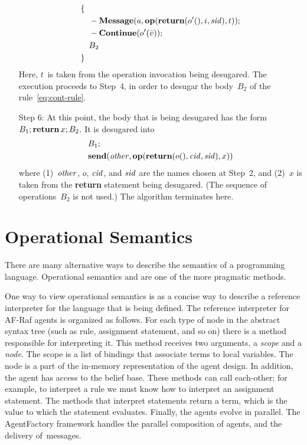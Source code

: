 \documentclass[a4paper,12pt,oneside,fleqn]{book} %
\begin{document}
\begin{itemize}
\begin{align}
\begin{aligned}
&\{ \\
&\quad -{\bf Message}(a,{\bf op}({\bf return}(o'(),i,{\it sid}), t)); \\
&\quad -{\bf Continue}(o'(\bar v)); \\
&\quad B_2 \\
&\}
\end{aligned}
\label{eq:cont-rule}
\end{align}
  Here, $t$~is taken from the operation invocation being desugared.  The
  execution proceeds to Step~4, in order to desugar the body~$B_2$ of the
  rule~\eqref{eq:cont-rule}.
\item[Step 6:]
  At this point, the body that is being desugared has the form $B_1;{\bf
  return}\,x;B_2$. It is desugared into
\begin{align}
\begin{aligned}
&B_1; \\
&{\bf send}({\it other}, {\bf op}({\bf return}(o(), {\it cid}, {\it sid}), x))
\end{aligned}
\end{align}
  where (1)~$\it other$, $o$, $\it cid$, and $\it sid$ are the names chosen
  at Step~2, and (2)~$x$ is taken from the {\bf return} statement being
  desugared. (The sequence of operations~$B_2$ is not used.) The algorithm
  terminates here.
\end{itemize}

\section{Operational Semantics}\label{sec:opsem} %

There are many alternative ways to describe the semantics of a programming
language. Operational semantics and are one of the more pragmatic methods.

One way to view operational semantics is as a concise way to describe a
reference interpreter for the language that is being defined. The reference
interpreter for AF-Raf agents is organized as follows. For each type of
node in the abstract syntax tree (such as rule, assignment statement, and
so on) there is a method responsible for interpreting it. This method
receives two arguments, a \emph{scope} and a \emph{node}. The scope is a
list of bindings that associate terms to local variables. The node is a
part of the in-memory representation of the agent design. In addition, the
agent has access to the belief base. These methods can call each-other; for
example, to interpret a rule we must know how to interpret an assignment
statement. The methods that interpret statements return a term, which is
the value to which the statement evaluates. Finally, the agents evolve in
parallel. The AgentFactory framework handles the parallel composition of
agents, and the delivery of~messages.
\end{document}
